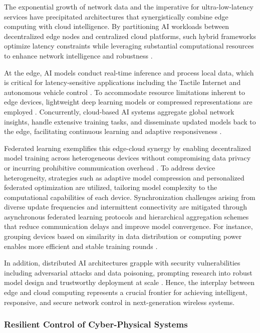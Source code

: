 \documentclass[sigconf]{acmart}
\begin{document}
The exponential growth of network data and the imperative for ultra-low-latency services have precipitated architectures that synergistically combine edge computing with cloud intelligence. By partitioning AI workloads between decentralized edge nodes and centralized cloud platforms, such hybrid frameworks optimize latency constraints while leveraging substantial computational resources to enhance network intelligence and robustness \cite{ref8,ref9,ref13,ref16,ref49,ref50}.

At the edge, AI models conduct real-time inference and process local data, which is critical for latency-sensitive applications including the Tactile Internet and autonomous vehicle control \cite{ref10}. To accommodate resource limitations inherent to edge devices, lightweight deep learning models or compressed representations are employed \cite{ref8,ref13}. Concurrently, cloud-based AI systems aggregate global network insights, handle extensive training tasks, and disseminate updated models back to the edge, facilitating continuous learning and adaptive responsiveness \cite{ref9,ref16}.

Federated learning exemplifies this edge-cloud synergy by enabling decentralized model training across heterogeneous devices without compromising data privacy or incurring prohibitive communication overhead \cite{ref10}. To address device heterogeneity, strategies such as adaptive model compression and personalized federated optimization are utilized, tailoring model complexity to the computational capabilities of each device. Synchronization challenges arising from diverse update frequencies and intermittent connectivity are mitigated through asynchronous federated learning protocols and hierarchical aggregation schemes that reduce communication delays and improve model convergence. For instance, grouping devices based on similarity in data distribution or computing power enables more efficient and stable training rounds \cite{ref9,ref10}.

In addition, distributed AI architectures grapple with security vulnerabilities including adversarial attacks and data poisoning, prompting research into robust model design and trustworthy deployment at scale \cite{ref49,ref50}. Hence, the interplay between edge and cloud computing represents a crucial frontier for achieving intelligent, responsive, and secure network control in next-generation wireless systems.

\subsubsection{Resilient Control of Cyber-Physical Systems}
\end{document}
